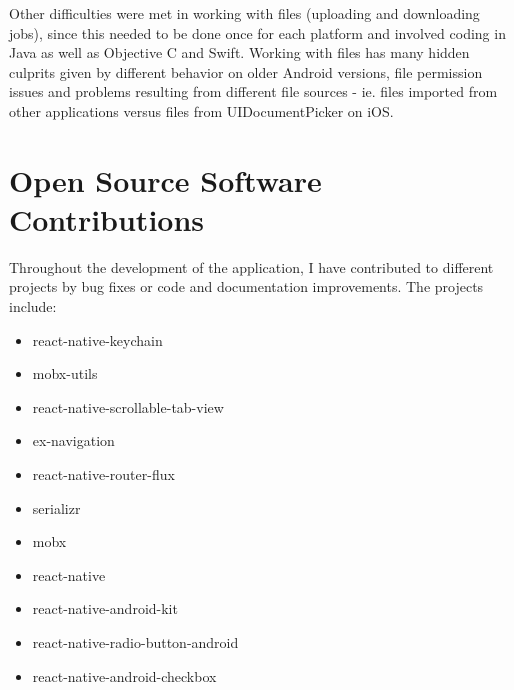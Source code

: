 Other difficulties were met in working with files (uploading and downloading jobs), since this needed to be done once for each platform and involved coding in Java as well as Objective C and Swift. Working with files has many hidden culprits given by different behavior on older Android versions, file permission issues and problems resulting from different file sources - ie. files imported from other applications versus files from UIDocumentPicker on iOS.


\section{Open Source Software Contributions}

Throughout the development of the application, I have contributed to different projects by bug fixes or code and documentation improvements. The projects include: 


\begin{itemize}
\item react-native-keychain
\item mobx-utils
\item react-native-scrollable-tab-view
\item ex-navigation
\item react-native-router-flux
\item serializr
\item mobx
\item react-native
\item react-native-android-kit
\item react-native-radio-button-android
\item react-native-android-checkbox
\end{itemize}
